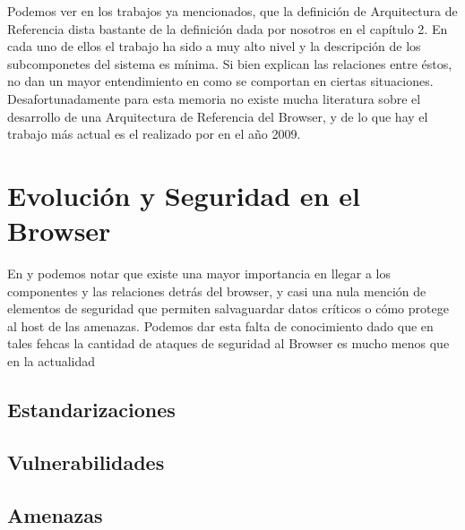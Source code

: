 Podemos ver en los trabajos ya mencionados, que la definición de Arquitectura de Referencia dista bastante de la definición dada por nosotros en el capítulo 2. En cada uno de ellos el trabajo ha sido a muy alto nivel y la descripción de los subcomponetes del sistema es mínima. Si bien explican las relaciones entre éstos, no dan un mayor entendimiento en como se comportan en ciertas situaciones. Desafortunadamente para esta memoria no existe mucha literatura sobre el desarrollo de una Arquitectura de Referencia del Browser, y de lo que hay el trabajo más actual es el realizado por \cite{Lwin2009} en el año 2009.




\section{Evolución y Seguridad en el Browser}
\label{chap3:EvoandSec}

En \cite{2005-grosskurth-browser-refarch} y \cite{preprint-grosskurth-browser-archevol} podemos notar que existe una mayor importancia en llegar a los componentes y las relaciones detrás del browser, y casi una nula mención de elementos de seguridad que permiten salvaguardar datos críticos o cómo protege al host de las amenazas. Podemos dar esta falta de conocimiento dado que en tales fehcas la cantidad de ataques de seguridad al Browser es mucho menos que en la actualidad %


\subsection{Estandarizaciones}
\label{chap3:Standars}

\subsection{Vulnerabilidades}
\label{chap3:vuln}

\subsection{Amenazas}
\label{chap3:threats}

